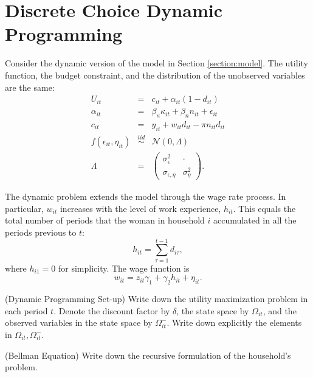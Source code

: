 \section{Discrete Choice Dynamic Programming}
Consider the dynamic version of the model in Section \ref{section:model}. The utility function, the budget constraint, and the distribution of the unobserved variables are the same:
\begin{eqnarray}
U_{it} &=& c_{it} + \alpha_{it} (1 - d_{it})\\
\alpha_{it} &=& \beta_{\kappa} \kappa_{it} + \beta_{n} n_{it} + \epsilon_{it}\\
c_{it} &=& y_{it} + w_{it} d_{it} - \pi n_{it} d_{it}\\
f \left( \epsilon_{it}, \eta_{it} \right) & \overset{iid}{\sim} & \mathcal{N} \left( 0, \Lambda \right)\\
\Lambda &=& \left( \begin{array}{cc} 
\sigma_{\epsilon}^2 & \cdot \\
\sigma_{\epsilon, \eta} & \sigma_{\eta}^2
\end{array} \right).
\end{eqnarray}

\indent The dynamic problem extends the model through the wage rate process. In particular, $w_{it}$ increases with the level of work experience, $h_{it}$. This equals the total number of periods that the woman in household $i$ accumulated in all the periods previous to $t$:
\begin{equation}
h_{it} = \sum\limits_{\tau=1}^{t-1} d_{i\tau},
\end{equation} 
\noindent where $h_{i1} = 0$ for simplicity. The wage function is
\begin{equation}
w_{it} = z_{it}\gamma_{1} + \gamma_{2}h_{it} + \eta_{it}.
\end{equation} 

\begin{exercise} (Dynamic Programming Set-up)
Write down the utility maximization problem in each period $t$. Denote the discount factor by  $\delta$, the state space by $\Omega_{it}$, and the observed variables in the state space by $\Omega_{it}^-$. Write down explicitly the elements in $\Omega_{it},\Omega_{it}^-$.
\end{exercise}

\begin{exercise} (Bellman Equation)
Write down the recursive formulation of the household's problem.
\end{exercise}

